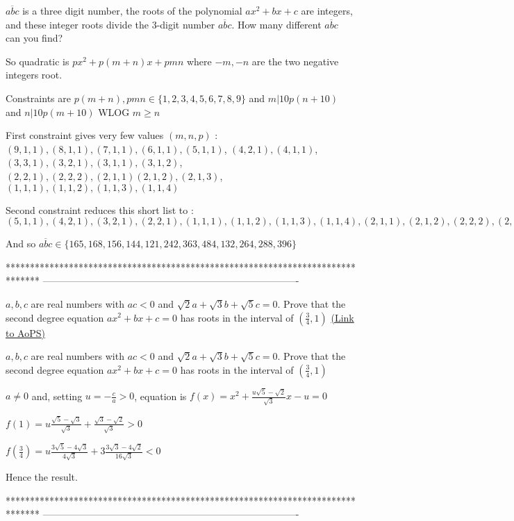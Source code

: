 \begin{solution}
	\begin{tcolorbox}$\overline{abc}$ is a three digit number, the roots of the polynomial $ ax^2 + bx +c $  are integers, and these integer roots divide the $3$-digit number $\overline{abc}$. How many different $\overline{abc}$ can you find?\end{tcolorbox}
So quadratic is $px^2+p(m+n)x+pmn$ where $-m,-n$ are the two negative integers root.

Constraints are $p(m+n),pmn\in\{1,2,3,4,5,6,7,8,9\}$ and $m|10p(n+10)$ and $n|10p(m+10)$
WLOG $m\ge n$

First constraint gives very few values $(m,n,p)$ : 
$(9,1,1),(8,1,1),(7,1,1),(6,1,1),(5,1,1)$,
$(4,2,1),(4,1,1)$,
$(3,3,1),(3,2,1),(3,1,1),(3,1,2)$,
$(2,2,1),(2,2,2),(2,1,1)(2,1,2),(2,1,3)$,
$(1,1,1),(1,1,2),(1,1,3),(1,1,4)$

Second constraint reduces this short list to :
$(5,1,1),(4,2,1),(3,2,1),(2,2,1),(1,1,1),(1,1,2),(1,1,3),(1,1,4),(2,1,1),(2,1,2),(2,2,2),(2,1,3)$

And so $\boxed{\overline{abc}\in\{165,168,156,144,121,242,363,484,132,264,288,396\}}$
\end{solution}
*******************************************************************************
-------------------------------------------------------------------------------

\begin{problem}
	$a,b,c$ are real numbers with $ac<0$ and $\sqrt{2}a+\sqrt{3}b+\sqrt{5}c=0$. Prove that the second degree equation $ax^2+bx+c=0$ has roots in the interval of $\left(\frac{3}{4}, 1 \right)$
	\flushright \href{https://artofproblemsolving.com/community/c6h585464}{(Link to AoPS)}
\end{problem}



\begin{solution}
	\begin{tcolorbox}$a,b,c$ are real numbers with $ac<0$ and $\sqrt{2}a+\sqrt{3}b+\sqrt{5}c=0$. Prove that the second degree equation $ax^2+bx+c=0$ has roots in the interval of $\left(\frac{3}{4}, 1 \right)$\end{tcolorbox}
$a\ne 0$ and, setting $u=-\frac ca>0$, equation is $f(x)=x^2+\frac{u\sqrt 5-\sqrt 2}{\sqrt 3}x-u=0$

$f(1)=u\frac{\sqrt 5-\sqrt 3}{\sqrt 3}+\frac{\sqrt 3-\sqrt 2}{\sqrt 3}>0$

$f(\frac 34)=u\frac{3\sqrt 5-4\sqrt 3}{4\sqrt 3}+3\frac{3\sqrt 3-4\sqrt 2}{16\sqrt 3} <0$

Hence the result.
\end{solution}
*******************************************************************************
-------------------------------------------------------------------------------

